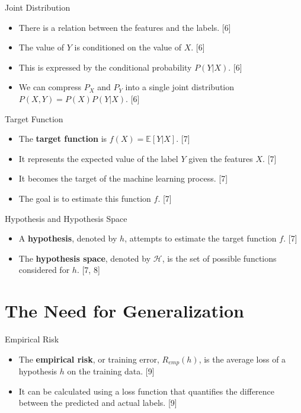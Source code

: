 \documentclass[
  ignorenonframetext,
]{beamer}
\providecommand{\tightlist}{%
  \setlength{\itemsep}{0pt}\setlength{\parskip}{0pt}}\usepackage{longtable,booktabs,array}
\begin{document}
\begin{frame}{Joint Distribution}
\label{joint-distribution}
\begin{itemize}
\tightlist
\item
  There is a relation between the features and the labels. {[}6{]}
\item
  The value of \(Y\) is conditioned on the value of \(X\). {[}6{]}
\item
  This is expressed by the conditional probability \(P(Y|X)\). {[}6{]}
\item
  We can compress \(P_X\) and \(P_Y\) into a single joint distribution
  \(P(X, Y) = P(X)P(Y|X)\). {[}6{]}
\end{itemize}
\end{frame}

\begin{frame}{Target Function}
\label{target-function}
\begin{itemize}
\tightlist
\item
  The \textbf{target function} is \(f(X) = \mathbb{E}[Y|X]\). {[}7{]}
\item
  It represents the expected value of the label \(Y\) given the features
  \(X\). {[}7{]}
\item
  It becomes the target of the machine learning process. {[}7{]}
\item
  The goal is to estimate this function \(f\). {[}7{]}
\end{itemize}
\end{frame}

\begin{frame}{Hypothesis and Hypothesis Space}
\label{hypothesis-and-hypothesis-space}
\begin{itemize}
\tightlist
\item
  A \textbf{hypothesis}, denoted by \(h\), attempts to estimate the
  target function \(f\). {[}7{]}
\item
  The \textbf{hypothesis space}, denoted by \(\mathcal{H}\), is the set
  of possible functions considered for \(h\). {[}7, 8{]}
\end{itemize}
\end{frame}

\section{The Need for Generalization}\label{the-need-for-generalization}

\begin{frame}{Empirical Risk}
\label{empirical-risk}
\begin{itemize}
\tightlist
\item
  The \textbf{empirical risk}, or training error, \(R_{emp}(h)\), is the
  average loss of a hypothesis \(h\) on the training data. {[}9{]}
\item
  It can be calculated using a loss function that quantifies the
  difference between the predicted and actual labels. {[}9{]}
\end{itemize}
\end{frame}
\end{document}
